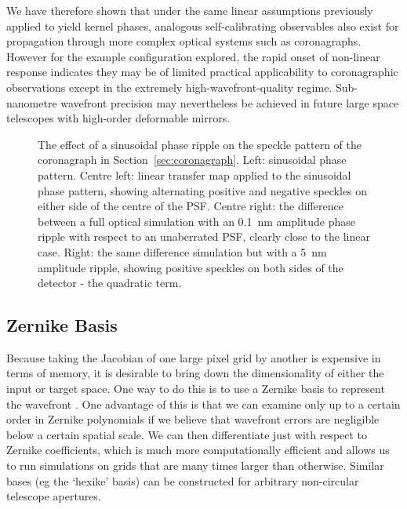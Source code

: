 \documentclass[modern]{aastex63}
\begin{document}
We have therefore shown that under the same linear assumptions previously applied to yield kernel phases, analogous self-calibrating observables also exist for propagation through more complex optical systems such as coronagraphs. However for the example configuration explored, the rapid onset of non-linear response indicates they may be of limited practical applicability to coronagraphic observations except in the extremely high-wavefront-quality regime. Sub-nanometre wavefront precision may nevertheless be achieved in future large space telescopes with high-order deformable mirrors.

\begin{figure}
\caption{The effect of a sinusoidal phase ripple on the speckle pattern of the coronagraph in Section~\ref{sec:coronagraph}. Left: sinusoidal phase pattern. Centre left: linear transfer map applied to the sinusoidal phase pattern, showing alternating positive and negative speckles on either side of the centre of the PSF. Centre right: the difference between a full optical simulation with an 0.1~nm amplitude phase ripple with respect to an unaberrated PSF, clearly close to the linear case. Right: the same difference simulation but with a 5~nm amplitude ripple, showing positive speckles on both sides of the detector - the quadratic term. \href{https://github.com/benjaminpope/morphine/blob/stable/notebooks/morphine_coronagraph.ipynb}{\color{linkcolor}\faGithub}
\label{corona_nonlinearity}}
\end{figure}

\subsection{Zernike Basis}
\label{zernike}

Because taking the Jacobian of one large pixel grid by another is expensive in terms of memory, it is desirable to bring down the dimensionality of either the input or target space. One way to do this is to use a Zernike basis to represent the wavefront \citep{zernike34}. One advantage of this is that we can examine only up to a certain order in Zernike polynomials if we believe that wavefront errors are negligible below a certain spatial scale. We can then differentiate just with respect to Zernike coefficients, which is much more computationally efficient and allows us to run simulations on grids that are many times larger than otherwise. Similar bases (eg the `hexike' basis) can be constructed for arbitrary non-circular telescope apertures.
\end{document}
